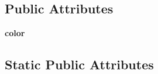 \subsection*{Public Attributes}
\begin{DoxyCompactItemize}
\item 
\hypertarget{class_tabuleiro_othello-fork_1_1models_1_1players_1_1min__max__ia__player_1_1_minmax_player_aca317a7219ecba27b0d347a50e6f05f7}{}{\bfseries color}\label{class_tabuleiro_othello-fork_1_1models_1_1players_1_1min__max__ia__player_1_1_minmax_player_aca317a7219ecba27b0d347a50e6f05f7}

\end{DoxyCompactItemize}
\subsection*{Static Public Attributes}
